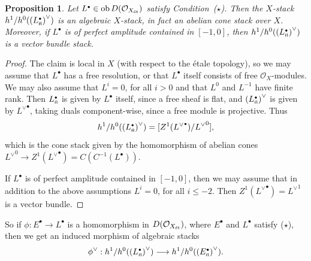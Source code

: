 \documentclass[11pt]{article}
\theoremstyle{plain}
\newtheorem{prop}{Proposition}[section]
\theoremstyle{definition}
\newenvironment{pf}{\begin{proof}}{\end{proof}}
\newcommand{\dual}[1]{{{#1}^{\vee}}}
\newcommand{\et}{{\mbox{\tiny \'{e}t}}}
\newcommand{\fl}{{\mbox{\tiny fl}}}
\newcommand{\com}{^{\scriptscriptstyle\bullet}}
\renewcommand{\O}{{\mathcal{O}}}
\newcommand{\ob}{\mathop{\rm ob}}
\theoremstyle{plain}
\theoremstyle{definition}
\theoremstyle{remark}
\begin{document}
\begin{prop} \label{has} Let \(L\com\in\ob D(\O_{X_\et})\) satisfy
Condition~{\rm (}\(\star\){\rm )}. Then the \(X\)-stack
\(h^1/h^0(\dual{(L\com_\fl)})\) is an algebraic \(X\)-stack, in fact an abelian
cone
stack over \(X\). Moreover, if \(L\com\) is of perfect amplitude contained in
\([-1,0]\), then
\(h^1/h^0(\dual{(L\com_\fl)})\) is a vector bundle stack.
\end{prop}
\begin{pf} The claim is local in \(X\) (with respect to the \'etale topology), so
we may assume that \(L\com\) has a free resolution, or that \(L\com\) itself
consists of free \(\O_X\)-modules. We may also assume that
\(L^i=0\), for all \(i>0\) and that \(L^0\) and \(L^{-1}\) have finite rank. Then
\(L\com_\fl\) is given by
\(L\com\) itself, since a free sheaf is flat, and \(\dual{(L\com_\fl)}\) is given
by
\(\dual{L}\com\), taking duals component-wise, since a free module is projective.
Thus
\[
h^1/h^0(\dual{(L\com_\fl)})=[Z^1(\dual{L}\com)/\dual{L}^0],
\]
which is the
cone stack given by the homomorphism of abelian cones \(\dual{L}^0\rightarrow
Z^1(\dual{L}\com)=C(C^{-1}(L\com))\).

If \(L\com\) is of perfect amplitude contained in \([-1,0]\), then we may assume
that in addition to the above assumptions \(L^i=0\), for all \(i\leq-2\). Then
\(Z^1(\dual{L}\com)=\dual{L}^1\) is a vector bundle.
\end{pf}

So if \(\phi:E\com\rightarrow L\com\) is a homomorphism in \(D(\O_{X_\et})\), where
\(E\com\) and
\(L\com\) satisfy (\(\star\)), then we get an induced morphism of algebraic stacks
\[
\dual{\phi}:h^1/h^0(\dual{(L\com_\fl)})\longrightarrow
h^1/h^0(\dual{(E\com_\fl)}).
\]
\end{document}
